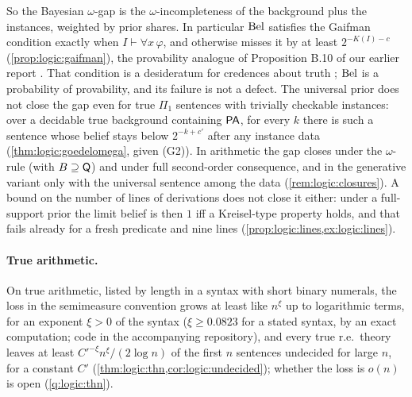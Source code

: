 So the Bayesian $\omega$-gap is the $\omega$-incompleteness of the background plus the instances, weighted by prior shares. In particular $\mathrm{Bel}$ satisfies the Gaifman condition \citep{gaifman1964concerning} exactly when $I\vdash\forall x\,\varphi$, and otherwise misses it by at least $2^{-K(I)-c}$ (\cref{prop:logic:gaifman}), the provability analogue of Proposition B.10 of our earlier report \citep{claude2026axiominduction}. That condition is a desideratum for credences about truth \citep{hutter2013probabilities}; $\mathrm{Bel}$ is a probability of provability, and its failure is not a defect. The universal prior does not close the gap even for true $\Pi_1$ sentences with trivially checkable instances: over a decidable true background containing $\mathsf{PA}$, for every $k$ there is such a sentence whose belief stays below $2^{-k+c'}$ after any instance data (\cref{thm:logic:goedelomega}, given (G2)). In arithmetic the gap closes under the $\omega$-rule (with $B\supseteq\mathsf{Q}$) and under full second-order consequence, and in the generative variant only with the universal sentence among the data (\cref{rem:logic:closures}). A bound on the number of lines of derivations does not close it either: under a full-support prior the limit belief is then $1$ iff a Kreisel-type property holds, and that fails already for a fresh predicate and nine lines (\cref{prop:logic:lines,ex:logic:lines}).

\paragraph{True arithmetic.}\label{sec:logic:thn} On true arithmetic, listed by length in a syntax with short binary numerals, the loss in the semimeasure convention grows at least like $n^\xi$ up to logarithmic terms, for an exponent $\xi>0$ of the syntax ($\xi\ge0.0823$ for a stated syntax, by an exact computation; code in the accompanying repository), and every true r.e.\ theory leaves at least $C'^{-\xi}n^\xi/(2\log n)$ of the first $n$ sentences undecided for large $n$, for a constant $C'$ (\cref{thm:logic:thn,cor:logic:undecided}); whether the loss is $o(n)$ is open (\cref{q:logic:thn}).
